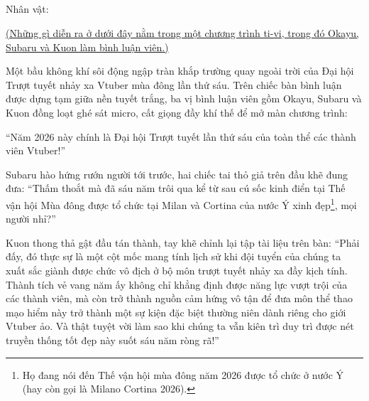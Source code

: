 \documentclass[../main.tex]{subfiles}
\begin{document}
\subsection*{\label{ep-003.I}}

\begin{center}
  {\caviar\fontsize{12pt}{12pt}\selectfont Nhân vật:          }
\end{center}

\begin{center}
  \uline{(Những gì diễn ra ở dưới đây nằm trong một chương trình ti-vi, trong đó Okayu, Subaru và Kuon làm bình luận viên.)}
\end{center}

Một bầu không khí sôi động ngập tràn khắp trường quay ngoài trời của Đại hội Trượt tuyết nhảy xa Vtuber mùa đông lần thứ sáu. Trên chiếc bàn bình luận được dựng tạm giữa nền tuyết trắng, ba vị bình luận viên gồm Okayu, Subaru và Kuon đồng loạt ghé sát micro, cất giọng đầy khí thế để mở màn chương trình:

``Năm 2026 này chính là Đại hội Trượt tuyết lần thứ sáu của toàn thể các thành viên Vtuber!''

Subaru hào hứng rướn người tới trước, hai chiếc tai thỏ giả trên đầu khẽ đung đưa: ``Thấm thoắt mà đã sáu năm trôi qua kể từ sau cú sốc kinh điển tại Thế vận hội Mùa đông được tổ chức tại Milan và Cortina của nước Ý xinh đẹp\footnote{Họ đang nói đến Thế vận hội mùa đông năm 2026 được tổ chức ở nước Ý (hay còn gọi là Milano Cortina 2026).}, mọi người nhỉ?''

Kuon thong thả gật đầu tán thành, tay khẽ chỉnh lại tập tài liệu trên bàn: ``Phải đấy, đó thực sự là một cột mốc mang tính lịch sử khi đội tuyển của chúng ta xuất sắc giành được chức vô địch ở bộ môn trượt tuyết nhảy xa đầy kịch tính. Thành tích vẻ vang năm ấy không chỉ khẳng định được năng lực vượt trội của các thành viên, mà còn trở thành nguồn cảm hứng vô tận để đưa môn thể thao mạo hiểm này trở thành một sự kiện đặc biệt thường niên dành riêng cho giới Vtuber ảo. Và thật tuyệt vời làm sao khi chúng ta vẫn kiên trì duy trì được nét truyền thống tốt đẹp này suốt sáu năm ròng rã!''
\end{document}
